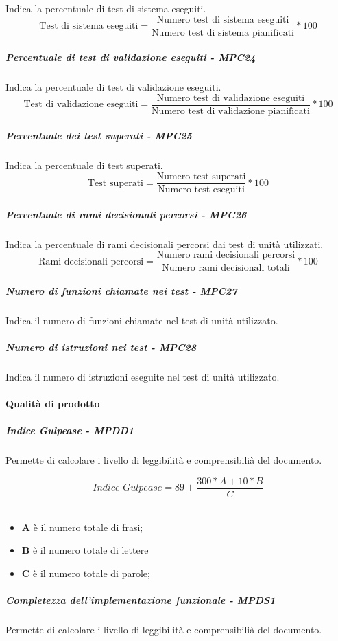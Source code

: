 Indica la percentuale di test di sistema eseguiti.
\begin{equation*}
\text{Test di sistema eseguiti} = \frac{\text{Numero test di sistema eseguiti}}{\text{Numero test di sistema pianificati}} * 100
\end{equation*}
\subparagraph{Percentuale di test di validazione eseguiti - MPC24}
Indica la percentuale di test di validazione eseguiti.
\begin{equation*}
\text{Test di validazione eseguiti} = \frac{\text{Numero test di validazione eseguiti}}{\text{Numero test di validazione pianificati}} * 100
\end{equation*}
\subparagraph{Percentuale dei test superati - MPC25}
Indica la percentuale di test superati.
\begin{equation*}
\text{Test superati} = \frac{\text{Numero test superati}}{\text{Numero test eseguiti}} * 100
\end{equation*}
\subparagraph{Percentuale di rami decisionali percorsi - MPC26}
Indica la percentuale di rami decisionali percorsi dai test di unità utilizzati.
\begin{equation*}
\text{Rami decisionali percorsi} = \frac{\text{Numero rami decisionali percorsi}}{\text{Numero rami decisionali totali}} * 100
\end{equation*}
\subparagraph{Numero di funzioni chiamate nei test - MPC27}
Indica il numero di funzioni chiamate nel test di unità utilizzato.
\subparagraph{Numero di istruzioni nei test - MPC28}
Indica il numero di istruzioni eseguite nel test di unità utilizzato.


\paragraph{Qualità di prodotto}
\subparagraph{Indice Gulpease - MPDD1}
Permette di calcolare i livello di leggibilità e comprensibilià del documento.

\begin{equation*}\textit{Indice Gulpease} = 89 + \frac{300 * \textit{A} + 10 * B}{C}\end{equation*} \\
\begin{itemize}
	\item \textbf{A} è il numero totale di frasi;
	\item \textbf{B} è il numero totale di lettere
	\item \textbf{C} è il numero totale di parole;
\end{itemize}
\subparagraph{Completezza dell’implementazione funzionale - MPDS1}
Permette di calcolare i livello di leggibilità e comprensibilià del documento.

